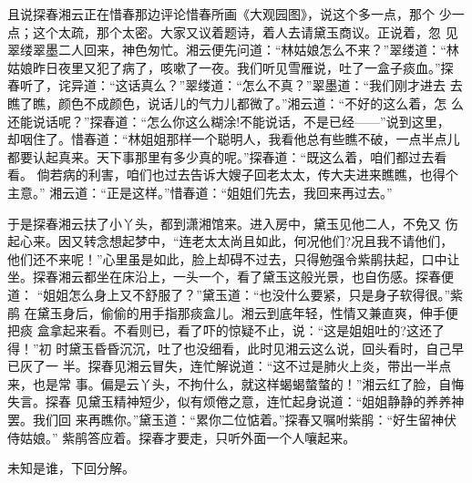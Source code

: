 且说探春湘云正在惜春那边评论惜春所画《大观园图》，说这个多一点，那个
少一点；这个太疏，那个太密。大家又议着题诗，着人去请黛玉商议。正说着，忽
见翠缕翠墨二人回来，神色匆忙。湘云便先问道：“林姑娘怎么不来？”翠缕道：“林
姑娘昨日夜里又犯了病了，咳嗽了一夜。我们听见雪雁说，吐了一盒子痰血。”探
春听了，诧异道：“这话真么？”翠缕道：“怎么不真？”翠墨道：“我们刚才进去
去瞧了瞧，颜色不成颜色，说话儿的气力儿都微了。”湘云道：“不好的这么着，怎
么还能说话呢？”探春道：“怎么你这么糊涂!不能说话，不是已经——”说到这里，
却咽住了。惜春道：“林姐姐那样一个聪明人，我看他总有些瞧不破，一点半点儿
都要认起真来。天下事那里有多少真的呢。”探春道：“既这么着，咱们都过去看看。
倘若病的利害，咱们也过去告诉大嫂子回老太太，传大夫进来瞧瞧，也得个主意。”
湘云道：“正是这样。”惜春道：“姐姐们先去，我回来再过去。”

于是探春湘云扶了小丫头，都到潇湘馆来。进入房中，黛玉见他二人，不免又
伤起心来。因又转念想起梦中，“连老太太尚且如此，何况他们?况且我不请他们，
他们还不来呢！”心里虽是如此，脸上却碍不过去，只得勉强令紫鹃扶起，口中让
坐。探春湘云都坐在床沿上，一头一个，看了黛玉这般光景，也自伤感。探春便道：
“姐姐怎么身上又不舒服了？”黛玉道：“也没什么要紧，只是身子软得很。”紫鹃
在黛玉身后，偷偷的用手指那痰盒儿。湘云到底年轻，性情又兼直爽，伸手便把痰
盒拿起来看。不看则已，看了吓的惊疑不止，说：“这是姐姐吐的?这还了得！”初
时黛玉昏昏沉沉，吐了也没细看，此时见湘云这么说，回头看时，自己早已灰了一
半。探春见湘云冒失，连忙解说道：“这不过是肺火上炎，带出一半点来，也是常
事。偏是云丫头，不拘什么，就这样蝎蝎螫螫的！”湘云红了脸，自悔失言。探春
见黛玉精神短少，似有烦倦之意，连忙起身说道：“姐姐静静的养养神罢。我们回
来再瞧你。”黛玉道：“累你二位惦着。”探春又嘱咐紫鹃：“好生留神伏侍姑娘。”
紫鹃答应着。探春才要走，只听外面一个人嚷起来。

未知是谁，下回分解。
